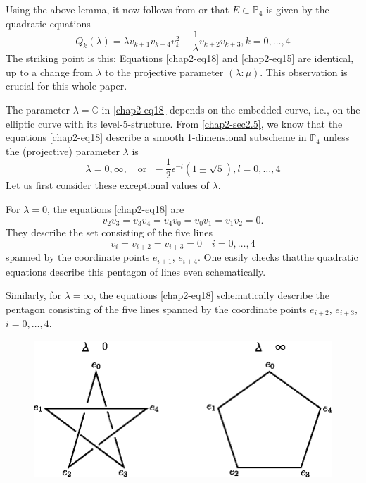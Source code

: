 Using the above lemma, it now follows from \cite{chap2-key3}
or \cite[prop.~IV.2.1]{chap2-key7} that $E\subset \mathbb{P}_{4}$ is
given by the quadratic equations
\setcounter{equation}{17}
\begin{equation}
Q_{k}(\lambda)=\lambda
v_{k+1}v_{k+4}v^{2}_{k}-\dfrac{1}{\lambda}v_{k+2}v_{k+3},k=0,\ldots,4\label{chap2-eq18}  
\end{equation}
The striking point is this: Equations \eqref{chap2-eq18}
and \eqref{chap2-eq15} are identical, up to a change from $\lambda$ to
the projective parameter $(\lambda:\mu)$. This observation is crucial
for this whole paper.

The parameter $\lambda=\mathbb{C}$ in \eqref{chap2-eq18} depends on
the embedded curve, i.e., on the elliptic curve with its
level-5-structure. From \ref{chap2-sec2.5}, we know that the
equations \eqref{chap2-eq18} describe a smooth 1-dimensional subscheme
in $\mathbb{P}_{4}$ unless the (projective) parameter $\lambda$ is
\begin{equation}
\lambda=0,\infty,\text{~~ or~~
}-\dfrac{1}{2}\epsilon^{-l}(1\pm \sqrt{5}), l=0,\ldots,4\label{chap2-eq19}
\end{equation}
Let us first consider these exceptional values of $\lambda$.

For $\lambda=0$, the equations \eqref{chap2-eq18} are
$$
v_{2}v_{3}=v_{3}v_{4}=v_{4}v_{0}=v_{0}v_{1}=v_{1}v_{2}=0.
$$
They describe the set consisting of the five lines
$$
v_{i}=v_{i+2}=v_{i+3}=0\quad i=0,\ldots,4
$$
spanned by the coordinate points $e_{i+1}$, $e_{i+4}$. One easily
checks that\pageoriginale the quadratic equations describe this
pentagon of lines even schematically.

Similarly, for $\lambda=\infty$, the equations \eqref{chap2-eq18}
schematically describe the pentagon consisting of the five lines
spanned by the coordinate points $e_{i+2}$, $e_{i+3}$, $i=0,\ldots,4$.

\begin{figure}[H]
\centering
\includegraphics{figures/chap2-fig2.eps}
\end{figure}

